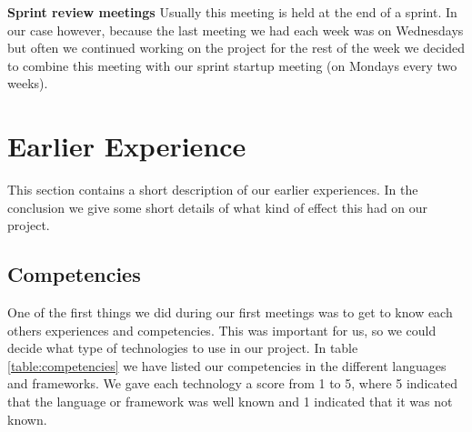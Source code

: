 \textbf{Sprint review meetings}\newline
Usually this meeting is held at the end of a sprint. In our case however, because the last meeting we had each
week was on Wednesdays but often we continued working on the project for the rest of the week we decided to
combine this meeting with our sprint startup meeting (on Mondays every two weeks).



\section{Earlier Experience}
\label{section:earlier-experience}

This section contains a short description of our earlier experiences.
In the conclusion we give some short details of what kind of effect this had on our project.

\subsection{Competencies}

One of the first things we did during our first meetings was to get to know each others experiences and competencies.
This was important for us, so we could decide what type of technologies to use in our project.
In table \ref{table:competencies} we have listed our competencies in the different languages and frameworks.
We gave each technology a score from 1 to 5, where 5 indicated that the language or framework was well known and 1 indicated that it was not known.

